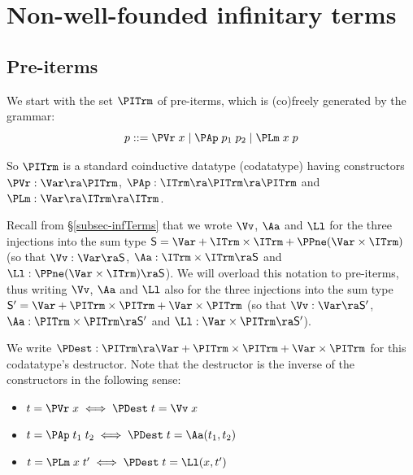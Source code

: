 \section{Non-well-founded infinitary terms 
}
\label{app-detailsIterms} 


\subsection{Pre-iterms}
\label{appsub-preiterm}

%
We start with the set $\PITrm$ of pre-iterms, which is (co)freely generated by the grammar:
$$p ::= \PVr\;x  \mid \PAp\;p_1\;p_2  \mid \PLm\;x\;p$$

So $\PITrm$ is a standard coinductive datatype (codatatype) \cite{DBLP:journals/tcs/Rutten00,DBLP:journals/mscs/KozenS17} 
%
having constructors $\PVr : \Var \ra \PITrm$, $\PAp : \ITrm \ra \PITrm \ra \PITrm$ 
and $\PLm : \Var \ra \ITrm \ra \ITrm$. 

Recall from \S\ref{subsec-infTerms} that 
we wrote $\Vv$, $\Aa$ and $\Ll$ %
for the three injections into the sum type  $\mathsf{S} = \Var + 
\ITrm \times \ITrm + \PPne(\Var\times \ITrm)$ (so that
$\Vv : \Var \ra \mathsf{S}$, 
$\Aa : \ITrm \times \ITrm \ra \mathsf{S}$ and 
$\Ll : \PPne(\Var\times \ITrm) \ra \mathsf{S}$).
%
We will overload this notation to pre-iterms, thus writing 
$\Vv$, $\Aa$ and $\Ll$ %
also for the three injections into the sum type  $\mathsf{S'} = \Var + 
\PITrm \times \PITrm + \Var\times \PITrm$ (so that
$\Vv : \Var \ra \mathsf{S'}$, 
$\Aa : \PITrm \times \PITrm \ra \mathsf{S'}$ and 
$\Ll : \Var\times \PITrm \ra \mathsf{S'}$). 

We write $\PDest : \PITrm \ra \Var + 
\PITrm \times \PITrm + \Var\times \PITrm$ for this codatatype's destructor. Note that the destructor is the inverse of the constructors in the following sense: 
\begin{itemize}
\item $t = \PVr\;x \iff \PDest\;t = \Vv\;x$
 \item $t = \PAp\;t_1\;t_2 \iff \PDest\;t = \Aa (t_1,t_2)$
\item $t = \PLm\;x\;t' \iff \PDest\;t = \Ll(x,t')$
\end{itemize}

